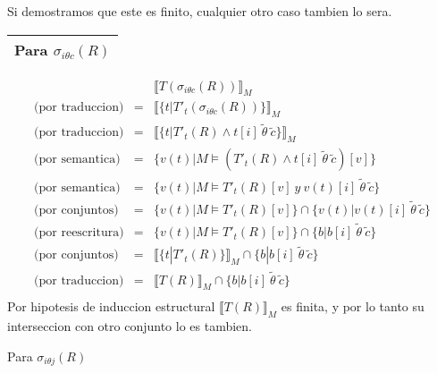 \documentclass[a4paper]{article}
\begin{document}
		Si demostramos que este es finito, cualquier otro caso tambien lo sera.\\
%
	\begin{center}
	\begin{tabular}{p{12cm}}
	\hline
	\textbf{Para $\sigma _{i \theta c}(R)$} \\
	\hline
	\end{tabular}
	\end{center}
%	
		\begin{eqnarray*}
			&& \llbracket T(\sigma _{i \theta c}(R))\rrbracket _M \\
			\mbox{(por traduccion)} & = & \llbracket \{t|T'_t(\sigma _{i \theta c}(R))\}\rrbracket _M \\
			\mbox{(por traduccion)} & = & \llbracket \{t|T'_t(R) \wedge t[i] \ \widetilde{\theta} \ \widetilde{c} \}\rrbracket _M \\
			\mbox{(por semantica)} & = & \{v(t)|M \models (T'_t(R) \wedge t[i] \ \widetilde{\theta} \ \widetilde{c})[v]\} \\
			\mbox{(por semantica)} & = & \{v(t)|M \models T'_t(R)[v] \ y \ v(t)[i] \ \widetilde{\theta} \ \widetilde{c}\} \\
			\mbox{(por conjuntos)} & = & \{v(t)|M \models T'_t(R)[v] \} \cap \{v(t)|v(t)[i] \ \widetilde{\theta} \ \widetilde{c}\} \\
			\mbox{(por reescritura)} & = & \{v(t)|M \models T'_t(R)[v] \} \cap \{b|b[i] \ \widetilde{\theta} \ \widetilde{c}\} \\
			\mbox{(por conjuntos)} & = & \llbracket \{t|T'_t(R)\}\rrbracket _M \cap \{b|b[i] \ \widetilde{\theta} \ \widetilde{c}\} \\
			\mbox{(por traduccion)} & = & \llbracket T(R)\rrbracket _M \cap \{b|b[i] \ \widetilde{\theta} \ \widetilde{c}\} \\
		\end{eqnarray*}
		Por hipotesis de induccion estructural $\llbracket T(R)\rrbracket _M$ es finita, y por lo tanto su interseccion con otro conjunto lo es tambien.
	
	Para $ \sigma _{i \theta j}(R) $\\
	
\end{document}
